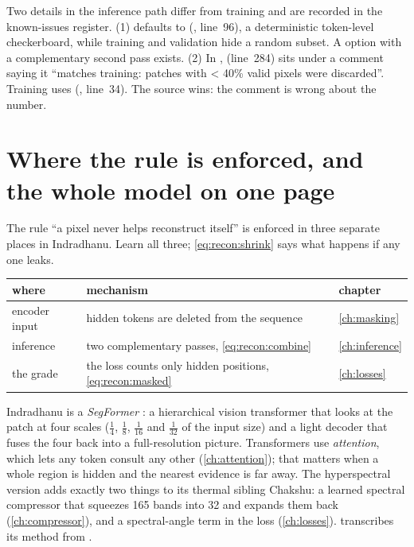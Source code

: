 \begin{sourcenote}
Two details in the inference path differ from training and are recorded in the known-issues register.
(1)  defaults to 
(, line~96), a deterministic token-level checkerboard,
while training and validation hide a random subset. A  option with a complementary
second pass exists. (2) In ,
 (line~284) sits under a comment saying it ``matches training: patches
with < 40\% valid pixels were discarded''. Training uses 
(, line~34). The source
wins: the comment is wrong about the number.
\end{sourcenote}

\section{Where the rule is enforced, and the whole model on one page}\label{sec:recon:indradhanu}

The rule ``a pixel never helps reconstruct itself'' is enforced in three separate places in
Indradhanu. Learn all three; \cref{eq:recon:shrink} says what happens if any one leaks.

\begin{center}
\begin{tabular}{lll}
\toprule
where & mechanism & chapter\\
\midrule
encoder input & hidden tokens are deleted from the sequence & \cref{ch:masking}\\
inference & two complementary passes, \cref{eq:recon:combine} & \cref{ch:inference}\\
the grade & the loss counts only hidden positions, \cref{eq:recon:masked} & \cref{ch:losses}\\
\bottomrule
\end{tabular}
\end{center}

Indradhanu is a \emph{SegFormer} \citep{xie2021segformer}: a hierarchical vision
transformer that looks at the patch at four scales ($\tfrac14$, $\tfrac18$, $\tfrac1{16}$ and
$\tfrac1{32}$ of the input size) and a light decoder that fuses the four back into a full-resolution
picture. Transformers use \emph{attention}, which lets any token consult any other
(\cref{ch:attention}); that matters when a whole region is hidden and the nearest evidence is far away.
The hyperspectral version adds exactly two things to its thermal sibling Chakshu: a learned spectral
compressor that squeezes 165 bands into 32 and expands them back (\cref{ch:compressor}), and a
spectral-angle term in the loss (\cref{ch:losses}).  transcribes its
 method from .

